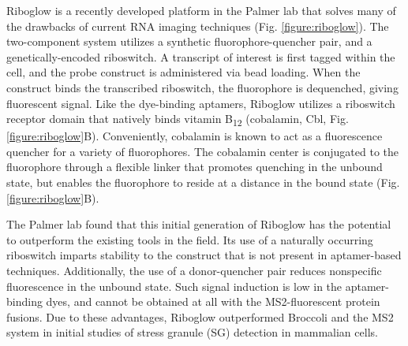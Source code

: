 Riboglow is a recently developed platform in the Palmer lab that solves many of the drawbacks of current RNA imaging techniques (Fig. \ref{figure:riboglow})\cite{BraselmannDevelopmentriboswitchbasedplatform2017}. The two-component system utilizes a synthetic fluorophore-quencher pair, and a genetically-encoded riboswitch. A transcript of interest is first tagged within the cell, and the probe construct is administered via bead loading\cite{McNeilGlassbeadsload1987,Hayashi-TakanakaTrackingepigenetichistone2011,MorisakiRealtimequantificationsingle2016}.
When the construct binds the transcribed riboswitch, the fluorophore is dequenched, giving fluorescent signal. Like the dye-binding aptamers, Riboglow utilizes a riboswitch receptor domain that natively binds vitamin B\textsubscript{12} (cobalamin, Cbl, Fig. \ref{figure:riboglow}B)\cite{JohnsonJrB12cofactorsdirectly2012}.
Conveniently, cobalamin is known to act as a fluorescence quencher for a variety of fluorophores\cite{RosendahlSynthesisbiologicalactivity1982,LeeDesignSynthesisCharacterization2009,SmeltzerSynthesisCharacterizationFluorescent2001}.
The cobalamin center is conjugated to the fluorophore through a flexible linker that promotes quenching in the unbound state, but enables the fluorophore to reside at a distance in the bound state (Fig. \ref{figure:riboglow}B).

The Palmer lab found that this initial generation of Riboglow has the potential to outperform the existing tools in the field. Its use of a naturally occurring riboswitch imparts stability to the construct that is not present in aptamer-based techniques. Additionally, the use of a donor-quencher pair reduces nonspecific fluorescence in the unbound state. Such signal induction is low in the aptamer-binding dyes, and cannot be obtained at all with the MS2-fluorescent protein fusions. Due to these advantages, Riboglow outperformed Broccoli and the MS2 system in initial studies of stress granule (SG) detection in mammalian cells.

